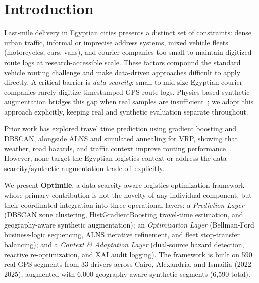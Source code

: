 \documentclass[conference]{IEEEtran}
\begin{document}
\section{\textbf{\large Introduction}}
\label{sec:intro}

Last-mile delivery in Egyptian cities presents a distinct set of constraints:
dense urban traffic, informal or imprecise address systems, mixed vehicle
fleets (motorcycles, cars, vans), and courier companies too small to maintain
digitized route logs at research-accessible scale. These factors compound the
standard vehicle routing challenge and make data-driven approaches difficult
to apply directly. A critical barrier is \textit{data scarcity}: small to
mid-size Egyptian courier companies rarely digitize timestamped GPS route
logs. Physics-based synthetic augmentation bridges this gap when real samples
are insufficient~\citep{jie_hybrid_2022, kodikara_comparing_2022}; we adopt
this approach explicitly, keeping real and synthetic evaluation separate
throughout.

Prior work has explored travel time prediction using gradient boosting and
DBSCAN, alongside ALNS and simulated annealing for VRP, showing that weather,
road hazards, and traffic context improve routing
performance~\citep{mara_survey_2022, ilhan_improved_2021,
pereira_approach_2024, liu_time-dependent_2020, moradi_prize-collecting_2025,
he_functionality_2024, abdulrashid_explainable_2024, jie_hybrid_2022,
gmira_managing_2021, kodikara_comparing_2022, prachitmutita_comparison_2020,
pahwa_assessing_2023}. However, none target the Egyptian logistics context
or address the data-scarcity/synthetic-augmentation trade-off explicitly.

We present \textbf{Optimile}, a data-scarcity-aware logistics optimization framework
whose primary contribution is not the novelty of any individual component, but
their coordinated integration into three operational layers: a
\textit{Prediction Layer} (DBSCAN zone clustering, HistGradientBoosting travel-time
estimation, and geography-aware synthetic augmentation); an \textit{Optimization
Layer} (Bellman-Ford business-logic sequencing, ALNS iterative refinement, and
fleet stop-transfer balancing); and a \textit{Context \& Adaptation Layer}
(dual-source hazard detection, reactive re-optimization, and XAI audit logging).
The framework is built on 590 real GPS segments from 33 drivers across Cairo,
Alexandria, and Ismailia (2022--2025), augmented with 6,000 geography-aware
synthetic segments (6,590 total).
\end{document}
